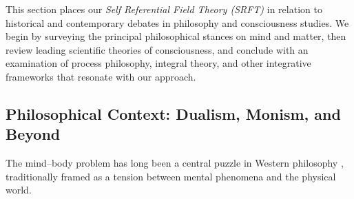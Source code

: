\documentclass[12pt,a4paper]{article}
\begin{document}
This section places our \emph{Self Referential Field Theory (SRFT)} in relation to historical and contemporary debates in philosophy and consciousness studies. We begin by surveying the principal philosophical stances on mind and matter, then review leading scientific theories of consciousness, and conclude with an examination of process philosophy, integral theory, and other integrative frameworks that resonate with our approach.

\subsection{Philosophical Context: Dualism, Monism, and Beyond}
\label{subsec:philosophical-context}

The mind--body problem has long been a central puzzle in Western philosophy \cite{descartes1641}, traditionally framed as a tension between mental phenomena and the physical world. 
\end{document}
